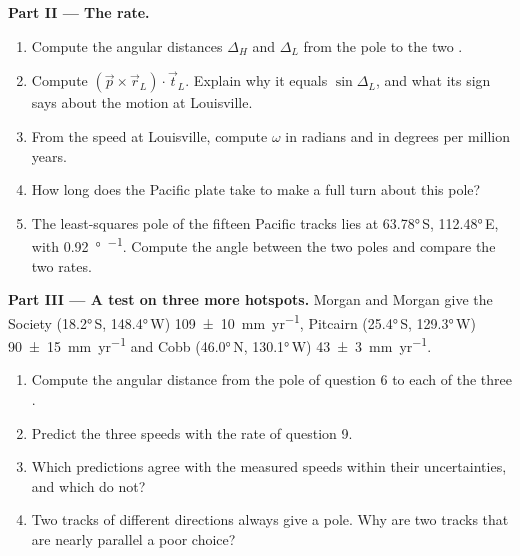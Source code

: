 \begin{problem}
\medskip
\noindent\textbf{Part II --- The rate.}
\begin{enumerate}[resume]
  \item Compute the angular distances $\Delta_H$ and $\Delta_L$ from the pole
        to the two .
  \item Compute $(\vec p\times\vec r_L)\cdot\vec t_L$. Explain why it equals
        $\sin\Delta_L$, and what its sign says about the motion at Louisville.
  \item From the speed at Louisville, compute $\omega$ in radians and in
        degrees per million years.
  \item How long does the Pacific plate take to make a full turn about this
        pole?
  \item The least-squares pole of the fifteen Pacific tracks lies at
        \ang{63.78}\,S, \ang{112.48}\,E, with \qty{0.92}{\degree\per\Myr}.
        Compute the angle between the two poles and compare the two rates.
\end{enumerate}

\medskip
\noindent\textbf{Part III --- A test on three more hotspots.} Morgan and
Morgan give the Society  (\ang{18.2}\,S, \ang{148.4}\,W)
\qty[uncertainty-mode=separate]{109 \pm 10}{mm.yr^{-1}}, Pitcairn
(\ang{25.4}\,S, \ang{129.3}\,W)
\qty[uncertainty-mode=separate]{90 \pm 15}{mm.yr^{-1}} and Cobb
(\ang{46.0}\,N, \ang{130.1}\,W)
\qty[uncertainty-mode=separate]{43 \pm 3}{mm.yr^{-1}}.
\begin{enumerate}[resume]
  \item Compute the angular distance from the pole of question 6 to each of the
        three .
  \item Predict the three speeds with the rate of question 9.
  \item Which predictions agree with the measured speeds within their
        uncertainties, and which do not?
  \item Two tracks of different directions always give a pole. Why are two
        tracks that are nearly parallel a poor choice?
\end{enumerate}


\end{problem}

